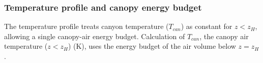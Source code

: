 \documentclass[preprint,12pt,authoryear]{elsarticle}
\begin{document}
%
%

\subsubsection{Temperature profile and canopy energy budget}\label{sec:tempprof}
The temperature profile treats canyon temperature ($T_{can}$) as constant for $z < z_{H}$, allowing a single canopy-air energy budget. Calculation of $T_{can}$, the canopy air temperature ($z < z_{H}$) (K), uses the energy budget of the air volume below $z = z_{H}$. 

%
%
%
%
%
\end{document}
